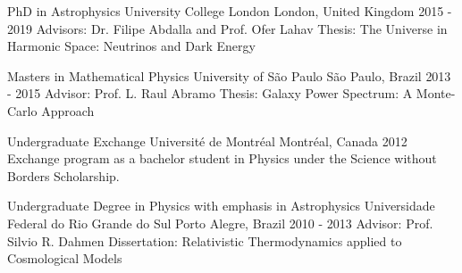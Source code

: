 

\begin{cventries}

 \cventry
    {PhD in Astrophysics} %
    {University College London} %
    {London, United Kingdom} %
    {2015 - 2019} %
    {
    Advisors: Dr. Filipe Abdalla and Prof. Ofer Lahav \linebreak
    Thesis: The Universe in Harmonic Space: Neutrinos and Dark Energy
    }
    
\cventry
    {Masters in Mathematical Physics} %
    {University of S\~{a}o Paulo} %
    {S\~{a}o Paulo, Brazil} %
    {2013 - 2015} %
    {
    Advisor: Prof. L. Raul Abramo \linebreak
    Thesis: Galaxy Power Spectrum: A Monte-Carlo Approach
    }
    
\cventry
    {Undergraduate Exchange} %
    {Universit\'{e} de Montr\'{e}al} %
    {Montr\'{e}al, Canada} %
    {2012} %
    {
    Exchange program as a bachelor student in Physics under the Science without Borders Scholarship.
    }

\cventry
    {Undergraduate Degree in Physics with emphasis in Astrophysics} %
    {Universidade Federal do Rio Grande do Sul} %
    {Porto Alegre, Brazil} %
    {2010 - 2013} %
    {
    Advisor: Prof. Silvio R. Dahmen
    Dissertation: Relativistic Thermodynamics applied to Cosmological Models
    }
\end{cventries}
